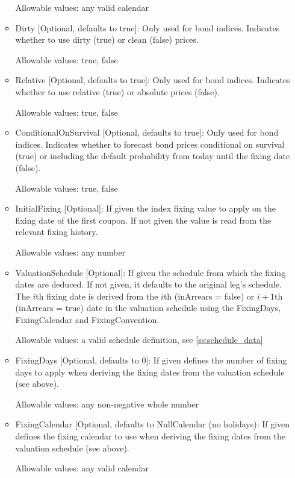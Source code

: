 \begin{itemize}
\begin{itemize}
  Allowable values: any valid calendar

\item Dirty [Optional, defaults to true]: Only used for bond indices. Indicates whether to use dirty (true) or clean
  (false) prices.

  Allowable values: true, false

\item Relative [Optional, defaults to true]: Only used for bond indices. Indicates whether to use relative (true) or
  absolute prices (false).

  Allowable values: true, false

\item ConditionalOnSurvival [Optional, defaults to true]: Only used for bond indices. Indicates whether to forecast bond
  prices conditional on survival (true) or including the default probability from today until the fixing date (false).

  Allowable values: true, false

\item InitialFixing [Optional]: If given the index fixing value to apply on the fixing date of the first coupon. If not
  given the value is read from the relevant fixing history.

  Allowable values: any number

\item ValuationSchedule [Optional]: If given the schedule from which the fixing dates are deduced. If not given, it
  defaults to the original leg's schedule. The $i$th fixing date is derived from the $i$th (inArrears = false) or
  $i+1$th (inArrears = true) date in the valuation schedule using the FixingDays, FixingCalendar and FixingConvention.

  Allowable values: a valid schedule definition, see \ref{ss:schedule_data}

\item FixingDays [Optional, defaults to 0]: If given defines the number of fixing days to apply when deriving the fixing
  dates from the valuation schedule (see above).

  Allowable values: any non-negative whole number

\item FixingCalendar [Optional, defaults to NullCalendar (no holidays): If given defines the fixing calendar to use when
  deriving the fixing dates from the valuation schedule (see above).

  Allowable values: any valid calendar


\end{itemize}
\end{itemize}
